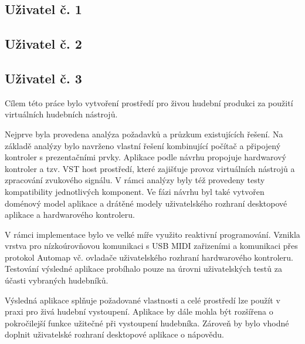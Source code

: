 \documentclass[thesis=M,czech]{FITthesis}[2019/03/06]
\begin{document}
		\subsection{Uživatel č. 1}
		\subsection{Uživatel č. 2}
		\subsection{Uživatel č. 3}
\begin{conclusion}
	Cílem této práce bylo vytvoření prostředí pro živou hudební produkci za použití virtuálních hudebních nástrojů.
	
	Nejprve byla provedena analýza požadavků a průzkum existujících řešení. Na základě analýzy bylo navrženo
	vlastní řešení kombinující počítač a připojený kontroler s prezentačními prvky. Aplikace podle návrhu propojuje hardwarový kontroler a tzv. VST host prostředí, které zajišťuje provoz virtuálních nástrojů a zpracování zvukového signálu. V rámci analýzy byly též provedeny testy kompatibility jednotlivých komponent. Ve fázi návrhu byl také vytvořen doménový model aplikace a drátěné modely uživatelského rozhraní desktopové aplikace a hardwarového kontroleru.
	
	V rámci implementace bylo ve velké míře využito reaktivní programování. Vznikla vrstva pro nízkoúrovňovou komunikaci s USB MIDI zařizeními a komunikaci přes protokol Automap vč. ovladače uživatelského rozhraní hardwarového kontroleru.
	Testování výsledné aplikace probíhalo pouze na úrovni uživatelských testů za účasti vybraných hudebníků.
	
	Výsledná aplikace splňuje požadované vlastnosti a celé prostředí lze použít v praxi pro živá hudební vystoupení. Aplikace by dále mohla být rozšířena o pokročilejší funkce užitečné při vystoupení hudebníka. Zároveň by bylo vhodné doplnit uživatelské rozhraní desktopové aplikace o nápovědu.
	
	
\end{conclusion}




\appendix
\end{document}
